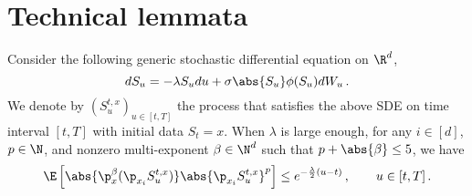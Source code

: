 \documentclass{amsart}
\begin{document}
\section{Technical lemmata}
\label{s:technical}

\begin{lemma}
	\label{lm:prop-gbm}
	Consider the following generic stochastic differential equation on $\R^d$,
	\begin{equation*}
		dS_u = -\lambda S_u du + \sigma \abs{S_u} \phi(S_u) dW_u \,.
	\end{equation*}
	We denote by $(S^{t,x}_u)_{u \in [t,T]}$ the process that satisfies the above SDE on time interval $[t,T]$ with initial data $S_t = x$. 
	When $\lambda$ is large enough, for any $i \in [d]$, $p \in \N$, and nonzero multi-exponent $\beta \in \N^d$ such that $p + \abs{\beta} \le 5$, we have 
	\begin{equation*}
		\E \left[ \abs{\p_x^\beta (\p_{x_i} S^{t,x}_u)} \abs{\p_{x_i} S^{t,x}_u}^p \right] \le e^{-\frac{\lambda}{2} (u-t)} \,, \qquad u \in [t,T] \,.
	\end{equation*}
\end{lemma}
\end{document}

